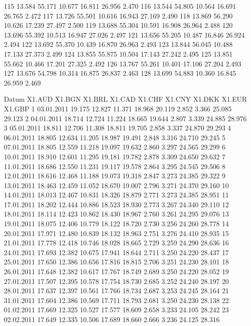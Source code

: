 \documentclass[a4paper,11pt]{scrartcl}
\begin{document}
\begin{Schunk}
\begin{Soutput}
115 13.584   55.171 10.677 16.811 26.956  2.470
116 13.544   54.805 10.564 16.691 26.765  2.472
117 13.726   55.501 10.616 16.943 27.169  2.490
118 13.869   56.290 10.626 17.239 27.497  2.500
119 13.688   55.304 10.591 16.908 26.964  2.488
120 13.696   55.392 10.513 16.947 27.026  2.497
121 13.656   55.205 10.487 16.846 26.924  2.494
122 13.692   55.370 10.439 16.870 26.963  2.493
123 13.844   56.045 10.488 17.133 27.373  2.499
124 13.855   55.875 10.504 17.143 27.242  2.495
125 13.851   55.662 10.466 17.201 27.325  2.492
126 13.767   55.261 10.401 17.106 27.204  2.493
127 13.676   54.798 10.314 16.875 26.837  2.463
128 13.699   54.883 10.360 16.845 26.959  2.469
\end{Soutput}
\begin{Soutput}
        Datum X1.AUD X1.BGN X1.BRL X1.CAD X1.CHF X1.CNY X1.DKK X1.EUR X1.GBP
1  03.01.2011 19.175 12.827 11.371 18.968 20.119  2.852  3.366 25.085 29.123
2  04.01.2011 18.714 12.724 11.224 18.665 19.644  2.807  3.339 24.885 28.976
3  05.01.2011 18.811 12.706 11.308 18.811 19.705  2.858  3.337 24.870 29.293
4  06.01.2011 18.805 12.634 11.205 18.987 19.491  2.848  3.316 24.710 29.245
5  07.01.2011 18.805 12.559 11.218 19.097 19.632  2.860  3.297 24.565 29.299
6  10.01.2011 18.910 12.601 11.295 19.181 19.782  2.878  3.309 24.650 29.632
7  11.01.2011 18.686 12.550 11.231 19.117 19.578  2.864  3.295 24.545 29.506
8  12.01.2011 18.616 12.468 11.188 19.073 19.318  2.847  3.273 24.385 29.322
9  13.01.2011 18.463 12.459 11.052 18.670 19.007  2.796  3.271 24.370 29.160
10 14.01.2011 18.013 12.467 10.831 18.326 18.879  2.771  3.273 24.385 28.951
11 17.01.2011 18.202 12.444 10.886 18.523 18.930  2.773  3.267 24.340 29.110
12 18.01.2011 18.114 12.423 10.862 18.430 18.967  2.760  3.261 24.295 29.076
13 19.01.2011 18.075 12.406 10.779 18.122 18.720  2.730  3.256 24.260 28.778
14 20.01.2011 17.971 12.480 10.839 18.132 18.963  2.751  3.276 24.410 28.935
15 21.01.2011 17.778 12.418 10.746 18.028 18.665  2.729  3.259 24.290 28.636
16 24.01.2011 17.693 12.382 10.675 17.941 18.644  2.711  3.250 24.220 28.437
17 25.01.2011 17.650 12.386 10.656 17.816 18.815  2.706  3.251 24.230 28.101
18 26.01.2011 17.648 12.382 10.617 17.767 18.749  2.689  3.250 24.220 28.052
19 27.01.2011 17.507 12.395 10.578 17.754 18.730  2.685  3.252 24.240 28.197
20 28.01.2011 17.637 12.397 10.561 17.766 18.734  2.687  3.253 24.245 28.164
21 31.01.2011 17.604 12.386 10.569 17.711 18.793  2.681  3.250 24.230 28.138
22 01.02.2011 17.669 12.325 10.527 17.577 18.609  2.658  3.233 24.105 28.242
23 02.02.2011 17.649 12.335 10.506 17.689 18.660  2.666  3.236 24.125 28.316

\end{Soutput}
\end{Schunk}
\end{document}
